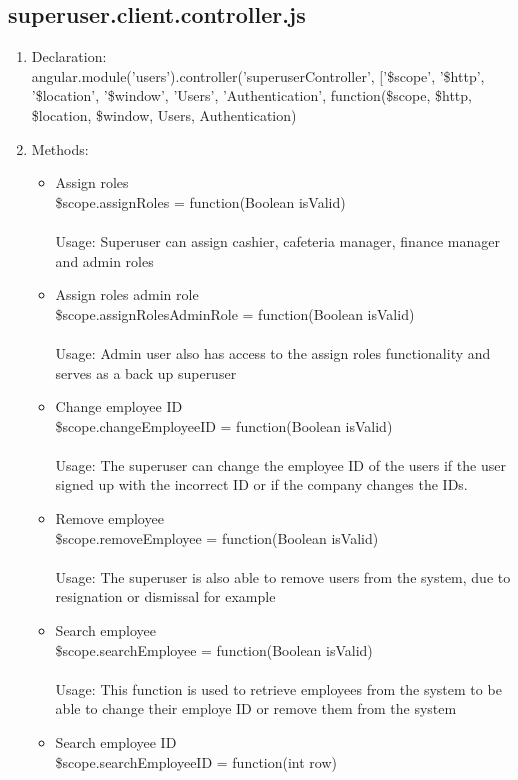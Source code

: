 \documentclass[a4paper,12pt]{report}
\begin{document}
\subsection{superuser.client.controller.js}
\begin{enumerate}
\item Declaration: \\ angular.module('users').controller('superuserController', ['\$scope', '\$http', '\$location', '\$window', 'Users', 'Authentication',
	function(\$scope, \$http, \$location, \$window, Users, Authentication)  
\item Methods: 
	\begin{itemize}
		\item Assign roles \\ \$scope.assignRoles = function(Boolean isValid)   \\ \\
		Usage: Superuser can assign cashier, cafeteria manager, finance manager and admin roles
		\item Assign roles admin role \\ \$scope.assignRolesAdminRole = function(Boolean isValid) \\ \\
		Usage: Admin user also has access to the assign roles functionality and serves as a back up superuser
		\item Change employee ID \\ \$scope.changeEmployeeID = function(Boolean isValid)\\ \\
		Usage: The superuser can change the employee ID of the users if the user signed up with the incorrect ID or if the company changes the IDs.
		\item Remove employee \\ \$scope.removeEmployee = function(Boolean isValid)  
		\\ \\ Usage: The superuser is also able to remove users from the system, due to resignation or dismissal for example
		\item Search employee \\ \$scope.searchEmployee = function(Boolean isValid)  
		\\ \\ Usage: This function is used to retrieve employees from the system to be able to change their employe ID or remove them from the system
		\item Search employee ID \\ \$scope.searchEmployeeID = function(int row)  

\end{itemize}
\end{enumerate}
\end{document}
